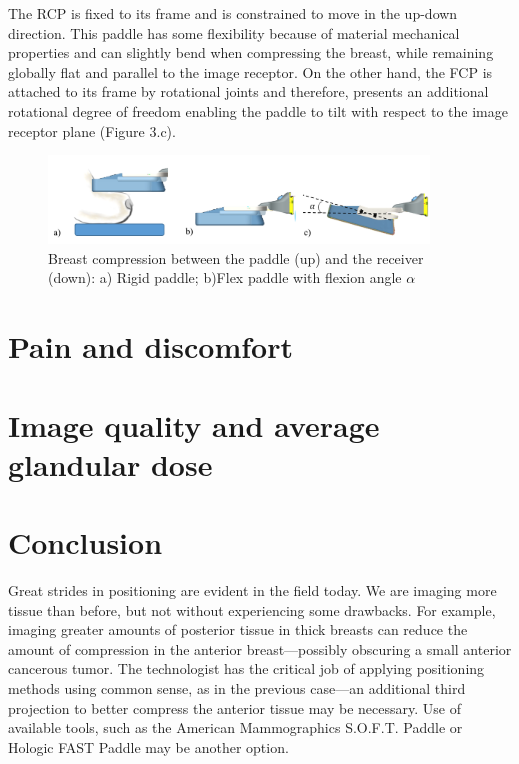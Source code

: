 The RCP is fixed to its frame and is constrained to move in the up-down direction. This paddle has some flexibility because of material mechanical properties and can slightly bend when compressing the breast, while remaining globally flat and parallel to the image receptor. On the other hand, the FCP is attached to its frame by rotational joints and therefore, presents an additional rotational degree of freedom enabling the paddle to tilt with respect to the image receptor plane (Figure 3.c). 

\begin{figure}[!h]
\centering
\includegraphics[width=0.9\textwidth,keepaspectratio]{figures/compressionpaddles.png} 
\caption{Breast compression between the paddle (up) and the receiver (down): a) Rigid paddle; b)Flex paddle with flexion angle $\alpha$}\label{fig:compressionpaddles}
\end{figure}

\section{Pain and discomfort}
\section{Image quality and average glandular dose}


\section{Conclusion}\label{section:compression:conclusion}

Great strides in positioning are evident in the field today.
We are imaging more tissue than before, but not without
experiencing some drawbacks. For example, imaging greater
amounts of posterior tissue in thick breasts can reduce the
amount of compression in the anterior breast—possibly
obscuring a small anterior cancerous tumor. The technologist
has the critical job of applying positioning methods using
common sense, as in the previous case—an additional third
projection to better compress the anterior tissue may be necessary.
Use of available tools, such as the American
Mammographics S.O.F.T. Paddle or Hologic FAST Paddle
may be another option.
